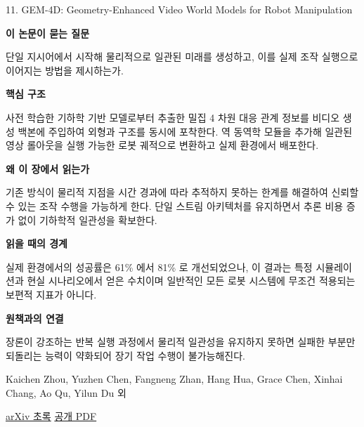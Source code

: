 \documentclass[11pt,openany]{book}
\begin{document}
\begin{termcard}{11. GEM-4D: Geometry-Enhanced Video World Models for Robot Manipulation}

\par

\medskip

{\sffamily\bfseries\color{deepblue} 이 논문이 묻는 질문}\par

단일 지시어에서 시작해 물리적으로 일관된 미래를 생성하고, 이를 실제 조작 실행으로 이어지는 방법을 제시하는가.

\smallskip

{\sffamily\bfseries\color{deepblue} 핵심 구조}\par

사전 학습한 기하학 기반 모델로부터 추출한 밀집 4 차원 대응 관계 정보를 비디오 생성 백본에 주입하여 외형과 구조를 동시에 포착한다. 역 동역학 모듈을 추가해 일관된 영상 롤아웃을 실행 가능한 로봇 궤적으로 변환하고 실제 환경에서 배포한다.

\smallskip

{\sffamily\bfseries\color{deepblue} 왜 이 장에서 읽는가}\par

기존 방식이 물리적 지점을 시간 경과에 따라 추적하지 못하는 한계를 해결하여 신뢰할 수 있는 조작 수행을 가능하게 한다. 단일 스트림 아키텍처를 유지하면서 추론 비용 증가 없이 기하학적 일관성을 확보한다.

\smallskip

{\sffamily\bfseries\color{coral} 읽을 때의 경계}\par

실제 환경에서의 성공률은 61\% 에서 81\% 로 개선되었으나, 이 결과는 특정 시뮬레이션과 현실 시나리오에서 얻은 수치이며 일반적인 모든 로봇 시스템에 무조건 적용되는 보편적 지표가 아니다.

\smallskip

{\sffamily\bfseries\color{teal} 원책과의 연결}\par

장론이 강조하는 반복 실행 과정에서 물리적 일관성을 유지하지 못하면 실패한 부분만 되돌리는 능력이 약화되어 장기 작업 수행이 불가능해진다.

\medskip

{\footnotesize\color{muted} Kaichen Zhou, Yuzhen Chen, Fangneng Zhan, Hang Hua, Grace Chen, Xinhai Chang, Ao Qu, Yilun Du 외\par

\href{https://arxiv.org/abs/2605.22882}{arXiv 초록} \quad \href{https://arxiv.org/pdf/2605.22882}{공개 PDF}\par}

\end{termcard}
\end{document}
